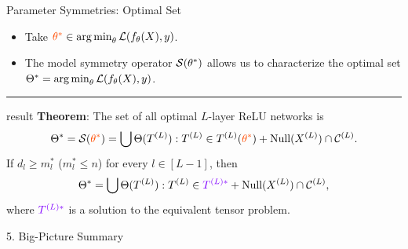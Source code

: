 \documentclass[usenames,dvipsnames,notheorems]{beamer}
\newcommand{\horizontalrule}{
	{
			\vspace{-0.5em}
			\center \rule{\textwidth}{0.1em}
			\vspace{-0.2em}
		}
}
\newcommand{\good}[1]{\textcolor{good}{#1}}
\begin{document}
\begin{frame}{Parameter Symmetries: Optimal Set}
	\begin{itemize}
		\item Take \( \textcolor{mikadoyellow}{\theta^*} \in \argmin_{\theta} \calL(f_\theta(X), y) \).
		      \pause
		      \vspace{1ex}

		\item The model \good{symmetry operator} \( \mathcal{S}(\theta^*) \) allows
		      us to characterize the \good{optimal set} \( \Theta^* = \mathop{\rm arg\,min}_{\theta} \mathcal{L}(f_\theta(X), y) \).
	\end{itemize}

	\pause
	\horizontalrule

	\begin{beamercolorbox}[wd=\textwidth,sep=1em]{result}
		\textbf{Theorem}:
		The set of all optimal \( L \)-layer ReLU networks is
		\[
			\Theta^*
			= \calS(\textcolor{mikadoyellow}{\theta^*})
			= \bigcup \Theta(\Tk) : \Tk \in \Tk(\textcolor{mikadoyellow}{\theta^*}) + \Null(\Xk) \cap \calCk.
		\]
		If \( d_l \geq m_l^* \) (\( m_l^* \leq n \)) for every \( l \in [L-1] \), then
		\begin{equation*}
			\Theta^* = \bigcup \Theta(\Tk) : \Tk \in \textcolor{violet}{\Tkopt} + \Null(\Xk) \cap \calCk,
		\end{equation*}
		where \( \textcolor{violet}{\Tkopt} \) is a solution to the equivalent tensor problem.
	\end{beamercolorbox}

\end{frame}

\begin{frame}{}
	\begin{center}
		\huge 5. Big-Picture Summary
	\end{center}
\end{frame}
\end{document}
